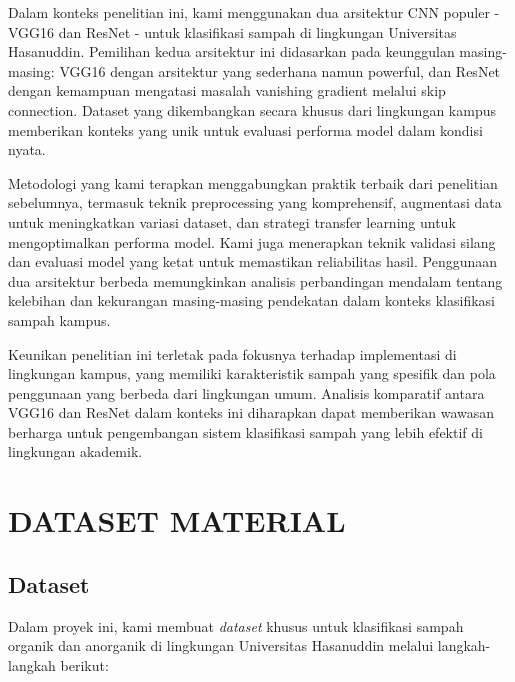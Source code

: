 \documentclass[12pt,a4paper]{article}
\begin{document}
\begin{adjustwidth}{3em}{0pt}
\vspace{1em}
\hspace{0.5cm} Dalam konteks penelitian ini, kami menggunakan dua arsitektur CNN populer - VGG16 dan ResNet - untuk klasifikasi sampah di lingkungan Universitas Hasanuddin. Pemilihan kedua arsitektur ini didasarkan pada keunggulan masing-masing: VGG16 dengan arsitektur yang sederhana namun powerful, dan ResNet dengan kemampuan mengatasi masalah vanishing gradient melalui skip connection. Dataset yang dikembangkan secara khusus dari lingkungan kampus memberikan konteks yang unik untuk evaluasi performa model dalam kondisi nyata.

\vspace{1em}
\hspace{0.5cm} Metodologi yang kami terapkan menggabungkan praktik terbaik dari penelitian sebelumnya, termasuk teknik preprocessing yang komprehensif, augmentasi data untuk meningkatkan variasi dataset, dan strategi transfer learning untuk mengoptimalkan performa model. Kami juga menerapkan teknik validasi silang dan evaluasi model yang ketat untuk memastikan reliabilitas hasil. Penggunaan dua arsitektur berbeda memungkinkan analisis perbandingan mendalam tentang kelebihan dan kekurangan masing-masing pendekatan dalam konteks klasifikasi sampah kampus.

\vspace{1em}
\hspace{0.5cm} Keunikan penelitian ini terletak pada fokusnya terhadap implementasi di lingkungan kampus, yang memiliki karakteristik sampah yang spesifik dan pola penggunaan yang berbeda dari lingkungan umum. Analisis komparatif antara VGG16 dan ResNet dalam konteks ini diharapkan dapat memberikan wawasan berharga untuk pengembangan sistem klasifikasi sampah yang lebih efektif di lingkungan akademik.

\end{adjustwidth}

\section{DATASET MATERIAL}
\subsection{Dataset}

Dalam proyek ini, kami membuat \textit{dataset} khusus untuk klasifikasi sampah organik dan anorganik di lingkungan Universitas Hasanuddin melalui langkah-langkah berikut:
\end{document}
